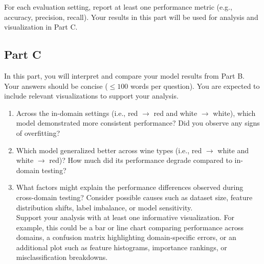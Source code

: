 \documentclass[11pt]{article}
\begin{document}
\noindent For each evaluation setting, report at least one performance metric (e.g., accuracy, precision, recall). Your results in this part will be used for analysis and visualization in Part C.

\subsection*{Part C}

In this part, you will interpret and compare your model results from Part B. Your answers should be concise ($\leq100 $ words per question). You are expected to include relevant visualizations to support your analysis.

\begin{enumerate}
    \item Across the in-domain settings (i.e., red $\rightarrow$ red and white $\rightarrow$ white), which model demonstrated more consistent performance? Did you observe any signs of overfitting?
    \item Which model generalized better across wine types (i.e., red $\rightarrow$ white and white $\rightarrow$ red)? How much did its performance degrade compared to in-domain testing?
    \item What factors might explain the performance differences observed during cross-domain testing? Consider possible causes such as dataset size, feature distribution shifts, label imbalance, or model sensitivity. \\
    Support your analysis with at least one informative visualization. For example, this could be a bar or line chart comparing performance across domains, a confusion matrix highlighting domain-specific errors, or an additional plot such as feature histograms, importance rankings, or misclassification breakdowns.
\end{enumerate}
\end{document}
